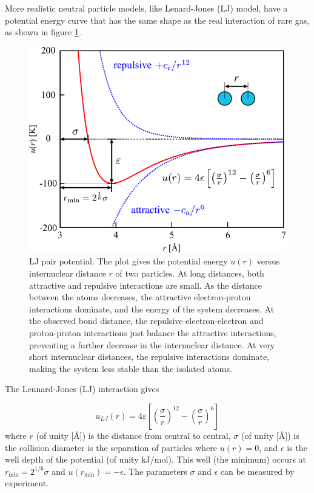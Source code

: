More realistic neutral particle models, like Lenard-Jones (LJ) model,
have a potential energy curve that has the same shape as the real
interaction of rare gas, as shown in figure \ref{fig:LJ-pair-potential}.

\begin{figure}[h]
\begin{centering}
\includegraphics[scale=0.82]{_figure/lj-centre}
\par\end{centering}

\caption[LJ pair potential]{LJ pair potential. The plot gives the potential energy $u(r)$ versus
internuclear distance $r$ of two particles. At long distances, both
attractive and repulsive interactions are small. As the distance between
the atoms decreases, the attractive electron-proton interactions dominate,
and the energy of the system decreases. At the observed bond distance,
the repulsive electron-electron and proton-proton interactions just
balance the attractive interactions, preventing a further decrease
in the internuclear distance. At very short internuclear distances,
the repulsive interactions dominate, making the system less stable
than the isolated atoms.\label{fig:LJ-pair-potential}}
\end{figure}


The Lennard-Jones (LJ) interaction gives

\begin{equation}
u_{LJ}(r)=4\varepsilon\left[\left(\frac{\sigma}{r}\right)^{12}-\left(\frac{\sigma}{r}\right)^{6}\right]
\end{equation}
where $r$ (of unity {[}$\textrm{\AA}${]}) is the distance from central
to central, $\sigma$ (of unity {[}$\textrm{\AA}${]}) is the collision
diameter is the separation of particles where $u(r)=0$, and $\epsilon$
is the well depth of the potential (of unity $\mathrm{kJ/mol}$).
This well (the minimum) occurs at $r_{\min}=2^{1/6}\sigma$ and $u(r_{\min})=-\epsilon$.
The parameters $\sigma$ and $\epsilon$ can be measured by experiment. 

